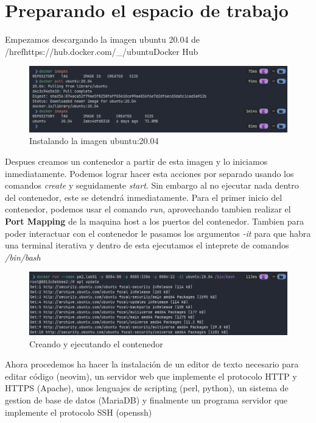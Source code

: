 \section{Preparando el espacio de trabajo}
Empezamos descargando la imagen ubuntu 20.04 de /href{https://hub.docker.com/_/ubuntu}{Docker Hub}

\begin{figure}[H]
  \centering
  \includegraphics[width=1.0\textwidth]{img/ubuntu_image.png}
  \caption{Instalando la imagen ubuntu:20.04}
\end{figure}

Despues creamos un contenedor a partir de esta imagen y lo iniciamos inmediatamente. Podemos lograr hacer 
esta acciones por separado usando los comandos \textit{create} y seguidamente \textit{start}. Sin embargo 
al no ejecutar nada dentro del contenedor, este se detendrá inmediatamente. 
\singlespacing
Para el primer inicio del contenedor, podemos usar el comando \textit{run}, aprovechando tambien realizar
el \textbf{Port Mapping} de la maquina host a los puertos del contenedor. Tambien para poder interactuar 
con el contenedor le pasamos los argumentos \textit{-it} para  que habra una terminal iterativa y dentro 
de esta ejecutamos el inteprete de comandos \textit{/bin/bash}

\begin{figure}[H]
  \centering
  \includegraphics[width=1.0\textwidth]{img/run_container.png}
  \caption{Creando y ejecutando el contenedor}
\end{figure}

Ahora procedemos ha hacer la instalación de un editor de texto necesario para editar código (neovim), un 
servidor web que implemente el protocolo HTTP y HTTPS (Apache), unos lenguajes de scripting (perl, python), 
un sistema de gestion de base de datos (MariaDB) y finalmente un programa servidor que implemente el 
protocolo SSH (openssh)

